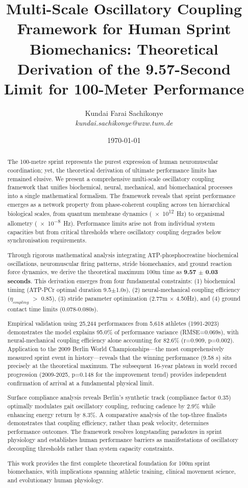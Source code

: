 \documentclass[10pt]{article}
\title{\textbf{Multi-Scale Oscillatory Coupling Framework for Human Sprint Biomechanics: Theoretical Derivation of the 9.57-Second Limit for 100-Meter Performance}}
\author{
Kundai Farai Sachikonye \\
\textit{kundai.sachikonye@wzw.tum.de}
}
\date{\today}
\begin{document}
\maketitle

\begin{abstract}
The 100-metre sprint represents the purest expression of human neuromuscular coordination; yet, the theoretical derivation of ultimate performance limits has remained elusive. We present a comprehensive multi-scale oscillatory coupling framework that unifies biochemical, neural, mechanical, and biomechanical processes into a single mathematical formalism. The framework reveals that sprint performance emerges as a network property from phase-coherent coupling across ten hierarchical biological scales, from quantum membrane dynamics (\SI{e12}{\hertz}) to organismal allometry (\SI{e-8}{\hertz}). Performance limits arise not from individual system capacities but from critical thresholds where oscillatory coupling degrades below synchronisation requirements.

Through rigorous mathematical analysis integrating ATP-phosphocreatine biochemical oscillations, neuromuscular firing patterns, stride biomechanics, and ground reaction force dynamics, we derive the theoretical maximum 100m time as \textbf{9.57 $\pm$ 0.03 seconds}. This derivation emerges from four fundamental constraints: (1) biochemical timing (ATP-PCr optimal duration 9.5$\pm$1.0s), (2) neural-mechanical coupling efficiency ($\eta_{coupling}$ $>$ 0.85), (3) stride parameter optimization (2.77m $\times$ 4.50Hz), and (4) ground contact time limits (0.078-0.080s).

Empirical validation using 25,244 performances from 5,618 athletes (1991-2023) demonstrates the model explains 95.0\% of performance variance (RMSE=0.069s), with neural-mechanical coupling efficiency alone accounting for 82.6\% (r=0.909, p=0.002). Application to the 2009 Berlin World Championships—the most comprehensively measured sprint event in history—reveals that the winning performance (9.58 s) sits precisely at the theoretical maximum. The subsequent 16-year plateau in world record progression (2009-2025, p=0.148 for the improvement trend) provides independent confirmation of arrival at a fundamental physical limit.

Surface compliance analysis reveals Berlin's synthetic track (compliance factor 0.35) optimally modulates gait oscillatory coupling, reducing cadence by 2.9\% while enhancing energy return by 8.3\%. A comparative analysis of the top-three finalists demonstrates that coupling efficiency, rather than peak velocity, determines performance outcomes. The framework resolves longstanding paradoxes in sprint physiology and establishes human performance barriers as manifestations of oscillatory decoupling thresholds rather than system capacity constraints.

This work provides the first complete theoretical foundation for 100m sprint biomechanics, with implications spanning athletic training, clinical movement science, and evolutionary human physiology.
\end{abstract}
\end{document}
